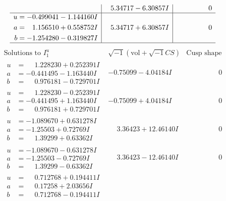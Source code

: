 \documentclass[1p]{elsarticle_modified}
\theoremstyle{definition}
\newcommand{\I}{\sqrt{-1}}
\begin{document}
$$\begin{array}{c|c|c}
 & \phantom{-}5.34717 - 6.30857 I & \phantom{-0.000000 } 0 \\ \hline\begin{aligned}
u &= -0.499041 - 1.144160 I \\
a &= \phantom{-}1.156510 + 0.558752 I \\
b &= -1.254280 - 0.319827 I\end{aligned}
 & \phantom{-}5.34717 + 6.30857 I & \phantom{-0.000000 } 0\\
 \hline 
 \end{array}$$\newpage$$\begin{array}{c|c|c}  
\text{Solutions to }I^u_{1}& \I (\text{vol} + \sqrt{-1}CS) & \text{Cusp shape}\\
 \hline 
\begin{aligned}
u &= \phantom{-}1.228230 + 0.252391 I \\
a &= -0.441495 - 1.163440 I \\
b &= \phantom{-}0.976181 - 0.729701 I\end{aligned}
 & -0.75099 - 4.04184 I & \phantom{-0.000000 } 0 \\ \hline\begin{aligned}
u &= \phantom{-}1.228230 - 0.252391 I \\
a &= -0.441495 + 1.163440 I \\
b &= \phantom{-}0.976181 + 0.729701 I\end{aligned}
 & -0.75099 + 4.04184 I & \phantom{-0.000000 } 0 \\ \hline\begin{aligned}
u &= -1.089670 + 0.631278 I \\
a &= -1.25503 + 0.72769 I \\
b &= \phantom{-}1.39299 + 0.63362 I\end{aligned}
 & \phantom{-}3.36423 + 12.46140 I & \phantom{-0.000000 } 0 \\ \hline\begin{aligned}
u &= -1.089670 - 0.631278 I \\
a &= -1.25503 - 0.72769 I \\
b &= \phantom{-}1.39299 - 0.63362 I\end{aligned}
 & \phantom{-}3.36423 - 12.46140 I & \phantom{-0.000000 } 0 \\ \hline\begin{aligned}
u &= \phantom{-}0.712768 + 0.194411 I \\
a &= \phantom{-}0.17258 + 2.03656 I \\
b &= \phantom{-}0.712768 - 0.194411 I\end{aligned}

\end{array}$$
\end{document}

